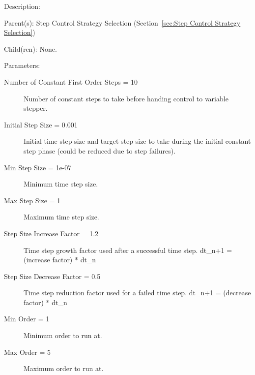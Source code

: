 \begin{list}{}
  {\setlength{\leftmargin}{1.0in}
   \setlength{\labelwidth}{0.75in}
   \setlength{\labelsep}{0.125in}}
  \item[Description:]
  \item[Parent(s):]
    Step Control Strategy Selection (Section~\ref{sec:Step Control Strategy Selection})
  \item[Child(ren):]
    None. 
  \item[Parameters:]
    \begin{description}
      \item[Number of Constant First Order Steps = 10] 
Number of constant steps to take before handing control to variable stepper.
      \item[Initial Step Size = 0.001] 
Initial time step size and target step size to take during the initial constant step phase (could be reduced due to step failures).
      \item[Min Step Size = 1e-07] 
Minimum time step size.
      \item[Max Step Size = 1] 
Maximum time step size.
      \item[Step Size Increase Factor = 1.2] 
Time step growth factor used after a successful time step. dt\_{n+1} = (increase factor) * dt\_n
      \item[Step Size Decrease Factor = 0.5] 
Time step reduction factor used for a failed time step. dt\_{n+1} = (decrease factor) * dt\_n
      \item[Min Order = 1] 
Minimum order to run at.
      \item[Max Order = 5] 
Maximum order to run at.

\end{description}
\end{list}
